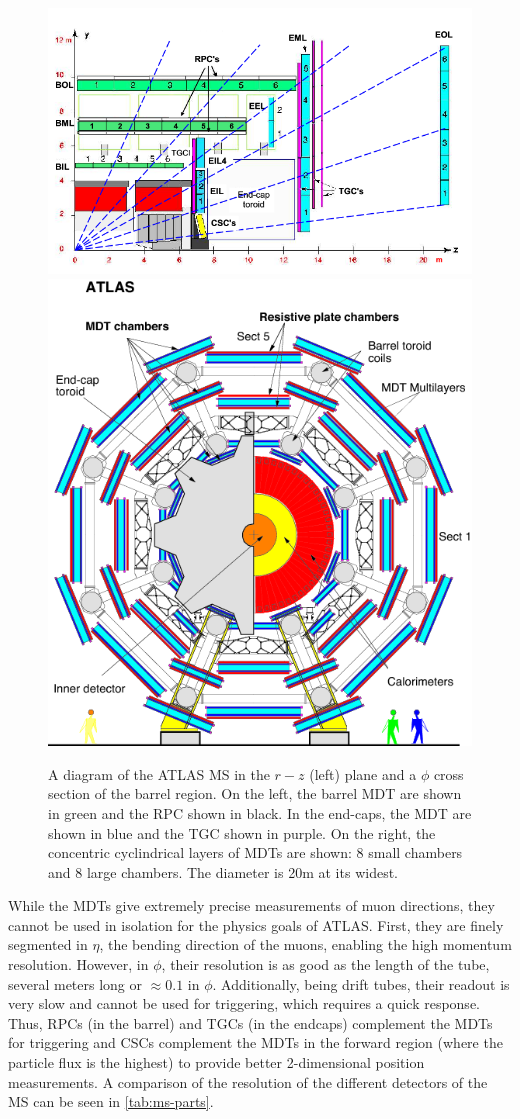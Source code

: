 \begin{figure}[!h]
\centering
\includegraphics[width=.6\textwidth]{figures/Detector/atlas-ms.png}
\includegraphics[width=.3\textwidth]{figures/Detector/mdt-phi.png}
\caption{A diagram of the \ac{ATLAS} \ac{MS} in the $r-z$ (left) plane and a $\phi$ cross section of the barrel region. On the left, the barrel \ac{MDT} are shown in green and the \ac{RPC} shown in black. In the end-caps, the \ac{MDT} are shown in blue and the \ac{TGC} shown in purple. On the right, the concentric cyclindrical layers of \ac{MDT}s are shown: 8 small chambers and 8 large chambers. The diameter is 20m at its widest. \cite{ms-vertices}}
\label{fig:atlas-ms}
\end{figure}


While the \ac{MDT}s give extremely precise measurements of muon directions, they cannot be used in isolation for the physics goals of \ac{ATLAS}. First, they are finely segmented in $\eta$, the bending direction of the muons, enabling the high momentum resolution. However, in $\phi$, their resolution is as good as the length of the tube, several meters long or $\approx 0.1$ in $\phi$. Additionally, being drift tubes, their readout is very slow and cannot be used for triggering, which requires a quick response. Thus, \ac{RPC}s (in the barrel) and \ac{TGC}s (in the endcaps) complement the \ac{MDT}s for triggering and \ac{CSC}s complement the \ac{MDT}s in the forward region (where the particle flux is the highest) to provide better 2-dimensional position measurements. A comparison of the resolution of the different detectors of the \ac{MS} can be seen in \autoref{tab:ms-parts}. 

